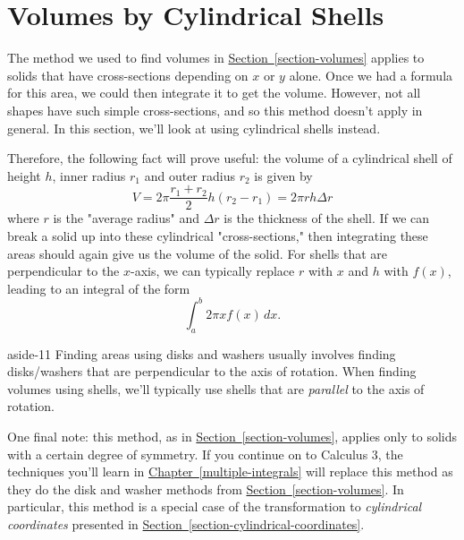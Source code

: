 \documentclass[10pt,]{book}
\numberwithin{equation}{section}
\begin{document}
\section[{Volumes by Cylindrical Shells}]{Volumes by Cylindrical Shells}\label{section-volumes-by-cylindrical-shells}
\hypertarget{p-638}{}%
The method we used to find volumes in \hyperref[section-volumes]{Section~\ref{section-volumes}} applies to solids that have cross-sections depending on \(x\) or \(y\) alone. Once we had a formula for this area, we could then integrate it to get the volume. However, not all shapes have such simple cross-sections, and so this method doesn't apply in general. In this section, we'll look at using cylindrical shells instead.%
\par
\hypertarget{p-639}{}%
Therefore, the following fact will prove useful: the volume of a cylindrical shell of height \(h\), inner radius \(r_{1}\) and outer radius \(r_{2}\) is given by%
\begin{equation}
V = 2\pi\frac{r_{1} + r_{2}}{2}h(r_{2} - r_{1}) = 2\pi rh\Delta r\label{equation-volume-cylindrical-shell}
\end{equation}
where \(r\) is the "average radius" and \(\Delta r\) is the thickness of the shell. If we can break a solid up into these cylindrical "cross-sections," then integrating these areas should again give us the volume of the solid. For shells that are perpendicular to the \(x\)-axis, we can typically replace \(r\) with \(x\) and \(h\) with \(f(x)\), leading to an integral of the form%
\begin{equation*}
\int_{a}^{b}2\pi xf(x)\,dx.
\end{equation*}
\begin{aside}{}{aside-11}%
\hypertarget{p-640}{}%
Finding areas using disks and washers usually involves finding disks/washers that are perpendicular to the axis of rotation. When finding volumes using shells, we'll typically use shells that are \emph{parallel} to the axis of rotation.%
\end{aside}
%
\par
\hypertarget{p-641}{}%
One final note: this method, as in \hyperref[section-volumes]{Section~\ref{section-volumes}}, applies only to solids with a certain degree of symmetry. If you continue on to Calculus 3, the techniques you'll learn in \hyperref[multiple-integrals]{Chapter~\ref{multiple-integrals}} will replace this method as they do the disk and washer methods from \hyperref[section-volumes]{Section~\ref{section-volumes}}. In particular, this method is a special case of the transformation to \emph{cylindrical coordinates} presented in \hyperref[section-cylindrical-coordinates]{Section~\ref{section-cylindrical-coordinates}}.%
\end{document}
